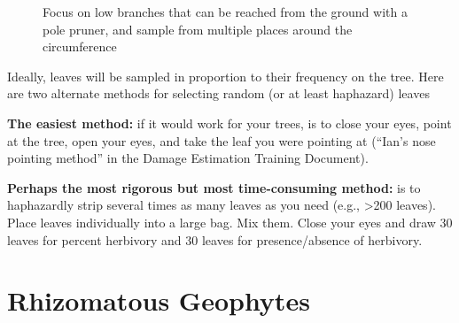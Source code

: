 \documentclass[
  letterpaper,
  oneside,
  open=any]{scrbook}
\begin{document}
\begin{figure}


\caption{\label{fig-tree}Focus on low branches that can be reached from
the ground with a pole pruner, and sample from multiple places around
the circumference}

\end{figure}%

Ideally, leaves will be sampled in proportion to their frequency on the
tree. Here are two alternate methods for selecting random (or at least
haphazard) leaves

\textbf{The easiest method:} if it would work for your trees, is to
close your eyes, point at the tree, open your eyes, and take the leaf
you were pointing at (``Ian's nose pointing method'' in the Damage
Estimation Training Document).

\textbf{Perhaps the most rigorous but most time-consuming method: } is
to haphazardly strip several times as many leaves as you need (e.g.,
\textgreater200 leaves). Place leaves individually into a large bag. Mix
them. Close your eyes and draw 30 leaves for percent herbivory and 30
leaves for presence/absence of herbivory.

\chapter{Rhizomatous Geophytes}\label{sec-rhizo}
\end{document}
